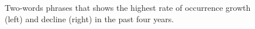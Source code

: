 \documentclass[geosciences,article,submit,moreauthors,pdftex]{Definitions/mdpi}
\begin{document}
\begin{figure}[ht!]

\begin{minipage}{0.49\linewidth}
\end{minipage}
\hfill
\begin{minipage}{0.49\linewidth}
\end{minipage}

\caption{Two-words phrases that shows the highest rate of occurrence growth (left)  and decline (right) in the past four years.}
\label{bigrams}
\end{figure}
\end{document}
